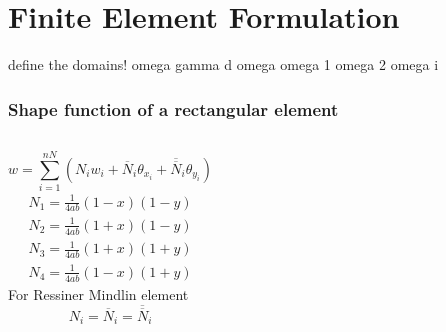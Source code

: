 \documentclass[9pt]{beamer}
\begin{document}
\section{Finite Element Formulation}


\begin{frame}
define the domains!
omega gamma d omega omega 1 omega 2 omega i
\end{frame}

\begin{frame}
\frametitle{Shape function of a rectangular  element}
 \begin{columns}
\begin{equation*}
w=\sum_{i=1}^{nN}\left(N_iw_i+\overline{N}_i\theta_{x_i}+\overline{\overline{N}}_i\theta_{y_i}\right)
\end{equation*}
\begin{align*}
N_1= \frac{1}{4ab}\left(1-x\right) \left(1-y\right)\\
{N}_2 = \frac{1}{4ab}\left(1+x\right) \left(1-y\right)\\
{N}_3= \frac{1}{4ab}\left(1+x\right) \left(1+y\right)\\
N_4=  \frac{1}{4ab}\left(1-x\right) \left(1+y\right)
\end{align*}
For Ressiner Mindlin  element
\begin{equation*}
N_i =\overline{N}_i =\overline{\overline{N}}_i
\end{equation*}

\begin{figure}[h!]
\centering

\end{figure}
\end{columns}
\end{frame}
\end{document}
